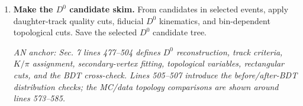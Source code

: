 \documentclass[10pt]{article}
\newcommand{\ananchor}[1]{\par{\footnotesize\emph{AN anchor: #1}}\par}
\begin{document}
\begin{enumerate}
\emph{Cuts used:}
\begin{itemize}
\item certified lumisection selection from the Golden JSON;
\item trigger bookkeeping: \texttt{isZDCOr == 1};
\item primary-vertex boolean filter: \texttt{pprimaryVertexFilter == 1};
\item vertex-position quality cut: \(|z_{\mathrm{PV}}| < 15~\mathrm{cm}\);
\item vertex-multiplicity cut: \(1 \le \texttt{nVtx} \le 3\);
\item cluster-compatibility boolean filter:
\texttt{pclusterCompatibilityFilter == 1};
\item halo-rejection boolean filter: \texttt{cscTightHalo2015Filter == true};
\item derived ZDC cut:
\[
(\texttt{ZDCsumMinus} > T_{\mathrm{ZDC}}^- \ \&\&
 \texttt{ZDCsumPlus} < T_{\mathrm{ZDC}}^+)
\quad \mathrm{or} \quad
(\texttt{ZDCsumPlus} > T_{\mathrm{ZDC}}^+ \ \&\&
 \texttt{ZDCsumMinus} < T_{\mathrm{ZDC}}^-);
\]
\item derived HF cut:
\[
(\texttt{ZDCgammaN} \ \&\&\ \texttt{HFEMaxPlus} < T_{\mathrm{HF}}^+)
\quad \mathrm{or} \quad
(\texttt{ZDCNgamma} \ \&\&\ \texttt{HFEMaxMinus} < T_{\mathrm{HF}}^-).
\]
\end{itemize}

\item \textbf{Make the \(D^0\) candidate skim.}
From candidates in selected events, apply daughter-track quality cuts,
fiducial \(D^0\) kinematics, and bin-dependent topological cuts. Save the
selected \(D^0\) candidate tree.
\ananchor{Sec. 7 lines 477--504 defines \(D^0\) reconstruction, track criteria,
\(K/\pi\) assignment, secondary-vertex fitting, topological variables,
rectangular cuts, and the BDT cross-check. Lines 505--507 introduce the
before/after-BDT distribution checks; the MC/data topology comparisons are
shown around lines 573--585.}


\end{enumerate}
\end{document}
